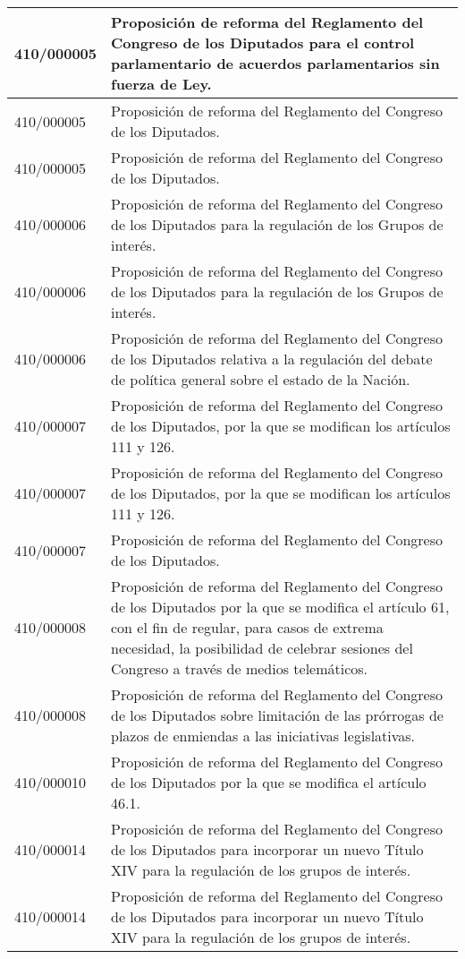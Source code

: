 {\begin{table}[H]
\begin{center}
\begin{tabularx}{\linewidth}{| l | X |}
\hline
410/000005 & Proposición de reforma del Reglamento del Congreso de los Diputados para el control parlamentario de acuerdos parlamentarios sin fuerza de Ley. \\
\hline
410/000005 & Proposición de reforma del Reglamento del Congreso de los Diputados. \\
\hline
410/000005 & Proposición de reforma del Reglamento del Congreso de los Diputados. \\
\hline
410/000006 & Proposición de reforma del Reglamento del Congreso de los Diputados para la regulación de los Grupos de interés. \\
\hline
410/000006 & Proposición de reforma del Reglamento del Congreso de los Diputados para la regulación de los Grupos de interés. \\
\hline
410/000006 & Proposición de reforma del Reglamento del Congreso de los Diputados relativa a la regulación del debate de política general sobre el estado de la Nación. \\
\hline
410/000007 & Proposición de reforma del Reglamento del Congreso de los Diputados, por la que se modifican los artículos 111 y 126. \\
\hline
410/000007 & Proposición de reforma del Reglamento del Congreso de los Diputados, por la que se modifican los artículos 111 y 126. \\
\hline
410/000007 & Proposición de reforma del Reglamento del Congreso de los Diputados. \\
\hline
410/000008 & Proposición de reforma del Reglamento del Congreso de los Diputados por la que se modifica el artículo 61, con el fin de regular, para casos de extrema necesidad, la posibilidad de celebrar sesiones del Congreso a través de medios telemáticos. \\
\hline
410/000008 & Proposición de reforma del Reglamento del Congreso de los Diputados sobre limitación de las prórrogas de plazos de enmiendas a las iniciativas legislativas. \\
\hline
410/000010 & Proposición de reforma del Reglamento del Congreso de los Diputados por la que se modifica el artículo 46.1. \\
\hline
410/000014 & Proposición de reforma del Reglamento del Congreso de los Diputados para incorporar un nuevo Título XIV para la regulación de los grupos de interés. \\
\hline
410/000014 & Proposición de reforma del Reglamento del Congreso de los Diputados para incorporar un nuevo Título XIV para la regulación de los grupos de interés. \\

\end{tabularx}
\end{center}
\end{table}}
